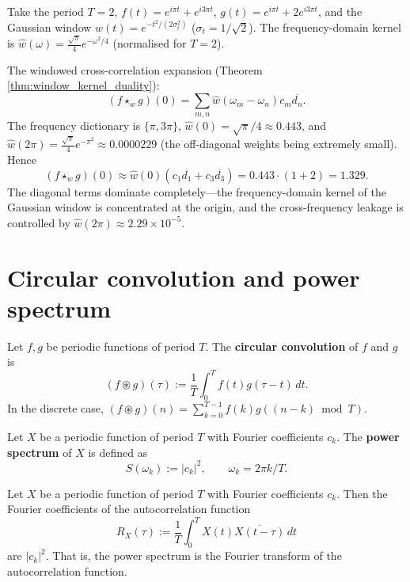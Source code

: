 \begin{example}\label{ex:window_kernel_numerical}
Take the period $T = 2$, $f(t) = e^{i\pi t} + e^{i3\pi t}$, $g(t) = e^{i\pi t} + 2e^{i3\pi t}$, and the Gaussian window $w(t) = e^{-t^2/(2\sigma_t^2)}$ ($\sigma_t = 1/\sqrt{2}$). The frequency-domain kernel is $\widehat{w}(\omega) = \frac{\sqrt{\pi}}{4} e^{-\omega^2/4}$ (normalised for $T=2$).

The windowed cross-correlation expansion (Theorem \ref{thm:window_kernel_duality}):
\[
(f \star_w g)(0) = \sum_{m,n} \widehat{w}(\omega_m - \omega_n) c_m \overline{d_n}.
\]
The frequency dictionary is $\{\pi, 3\pi\}$, $\widehat{w}(0) = \sqrt{\pi}/4 \approx 0.443$, and $\widehat{w}(2\pi) = \frac{\sqrt{\pi}}{4} e^{-\pi^2} \approx 0.0000229$ (the off-diagonal weights being extremely small). Hence
\[
(f \star_w g)(0) \approx \widehat{w}(0)(c_1\overline{d_1} + c_3\overline{d_3}) = 0.443 \cdot (1 + 2) = 1.329.
\]
The diagonal terms dominate completely---the frequency-domain kernel of the Gaussian window is concentrated at the origin, and the cross-frequency leakage is controlled by $\widehat{w}(2\pi) \approx 2.29 \times 10^{-5}$.
\end{example}

\section{\texorpdfstring{Circular convolution and power spectrum}{Circular convolution and power spectrum}}

\begin{definition}\label{def:circular_convolution_harmonic}
Let $f, g$ be periodic functions of period $T$. The \textbf{circular convolution} of $f$ and $g$ is
\[
(f \circledast g)(\tau) := \frac{1}{T}\int_0^T f(t) g(\tau - t)\, dt.
\]
In the discrete case, $(f \circledast g)(n) = \sum_{k=0}^{T-1} f(k) g((n-k) \bmod T)$.
\end{definition}

\begin{definition}\label{def:periodic_tendency_spectrum}
Let $X$ be a periodic function of period $T$ with Fourier coefficients $c_k$. The \textbf{power spectrum} of $X$ is defined as
\[
S(\omega_k) := |c_k|^2, \qquad \omega_k = 2\pi k/T.
\]
\end{definition}

\begin{theorem}\label{thm:spectrum_classical_limit}
Let $X$ be a periodic function of period $T$ with Fourier coefficients $c_k$. Then the Fourier coefficients of the autocorrelation function
\[
R_X(\tau) := \frac{1}{T}\int_0^T X(t) \overline{X(t-\tau)}\, dt
\]
are $|c_k|^2$. That is, the power spectrum is the Fourier transform of the autocorrelation function.
\end{theorem}

